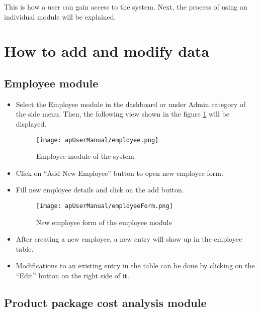 \documentclass[12pt]{report}
\begin{document}
This is how a user can gain access to the system. Next, the process of using an individual module will be explained.

\section{How to add and modify data}

\subsection{Employee module}
\begin{itemize}
	\item Select the Employee module in the dashboard or under Admin category of the side menu. Then, the following view shown in the figure \ref{fig:apUserManual_employee} will be displayed.
	      \begin{figure}[H]
		      \centering
		      \texttt{[image: apUserManual/employee.png]}
		      \caption{Employee module of the system}
		      \label{fig:apUserManual_employee}
	      \end{figure}

	\item Click on ``Add New Employee'' button to open new employee form.

	\item Fill new employee details and click on the add button.
	      \begin{figure}[H]
		      \centering
		      \texttt{[image: apUserManual/employeeForm.png]}
		      \caption{New employee form of the employee module}
	      \end{figure}

	\item After creating a new employee, a new entry will show up in the employee table.

	\item Modifications to an existing entry in the table can be done by clicking on the ``Edit'' button on the right side of it.

\end{itemize}

\subsection{Product package cost analysis module}
\end{document}
